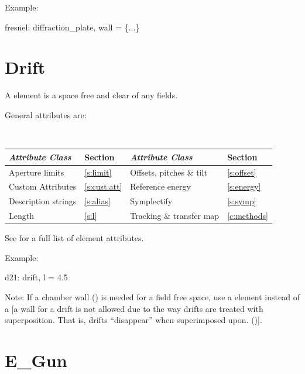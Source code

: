 Example:
\begin{example}
  fresnel: diffraction_plate, wall = \{...\}
\end{example}

\section{Drift}
\label{s:drift}

A  element is a space free and clear of any fields.

General  attributes are:
\begin{center}
\tt
\begin{tabular}{llll} \toprule
  {\sl Attribute Class}      & Section          & {\sl Attribute Class}      & Section         \\ \midrule
  Aperture limits            & \ref{s:limit}    & Offsets, pitches \& tilt   & \ref{s:offset}  \\
  Custom Attributes          & \ref{s:cust.att} & Reference energy           & \ref{s:energy}  \\ 
  Description strings        & \ref{s:alias}    & Symplectify                & \ref{s:symp}    \\ 
  Length                     & \ref{s:l}        & Tracking \& transfer map   & \ref{c:methods} \\ 
  \bottomrule
\end{tabular}
\end{center}
\toffset
See  for a full list of element attributes.

Example:
\begin{example}
  d21: drift, l = 4.5
\end{example}

Note: If a chamber wall () is needed for a field free
space, use a  element instead of a  [a wall for a
drift is not allowed due to the way drifts are treated with
superposition. That is, drifts ``disappear'' when superimposed
upon. ()].

\section{E_Gun}
\label{s:e.gun}


